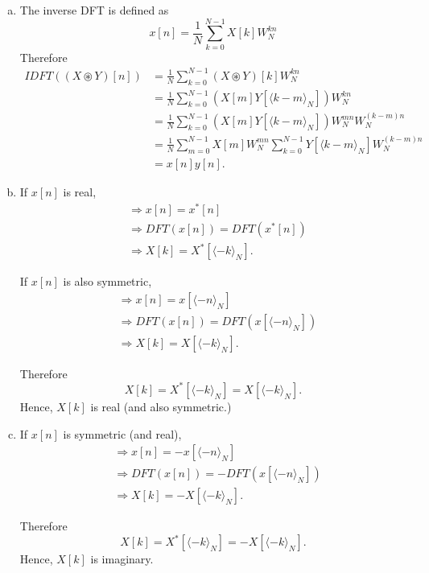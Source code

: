 \begin{enumerate}[(a)]
\item The inverse DFT is defined as
\[x[n] = \frac{1}{N} \sum_{k=0}^{N-1} X[k] W_N^{kn}\]
Therefore
\begin{align*}
	IDFT((X \circledast Y)[n])
	&= \frac{1}{N} \sum_{k=0}^{N-1} (X \circledast Y)[k] W_N^{kn} \\
	&= \frac{1}{N} \sum_{k=0}^{N-1} \left( X[m] Y[\langle k - m \rangle_N]\right) W_N^{kn} \\
	&= \frac{1}{N} \sum_{k=0}^{N-1} \left( X[m] Y[\langle k - m \rangle_N]\right) W_N^{mn} W_N^{(k-m)n} \\
	&= \frac{1}{N} \sum_{m=0}^{N-1} X[m]W_N^{mn} \sum_{k=0}^{N-1}Y[\langle k-m \rangle_N] W_N^{(k-m)n} \\
	&= x[n]y[n].
\end{align*}

\item If $x[n]$ is real,
\begin{align*}
	&\Rightarrow x[n] = x^*[n] \\
	&\Rightarrow DFT(x[n]) = DFT(x^*[n]) \\
	&\Rightarrow X[k] = X^*[\langle -k \rangle_N].
\end{align*}

If $x[n]$ is also symmetric,
\begin{align*}
	&\Rightarrow x[n] = x[\langle -n \rangle_N] \\
	&\Rightarrow DFT(x[n]) = DFT(x[\langle -n \rangle_N]) \\
	&\Rightarrow X[k] = X[\langle -k \rangle_N].
\end{align*}

Therefore
\[X[k] = X^*[\langle -k \rangle_N] = X[\langle -k \rangle_N].\]
Hence, $X[k]$ is real (and also symmetric.)

\item If $x[n]$ is symmetric (and real),
\begin{align*}
&\Rightarrow x[n] = -x[\langle -n \rangle_N] \\
&\Rightarrow DFT(x[n]) = -DFT(x[\langle -n \rangle_N]) \\
&\Rightarrow X[k] = -X[\langle -k \rangle_N].
\end{align*}

Therefore
\[X[k] = X^*[\langle -k \rangle_N] = -X[\langle -k \rangle_N].\]
Hence, $X[k]$ is imaginary.
\end{enumerate}